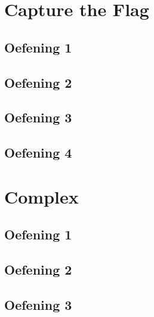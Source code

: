 \documentclass[a4paper,11pt]{report}
\begin{document}
\chapter{Capture the Flag}
\section{Oefening 1}

\section{Oefening 2}

\section{Oefening 3}

\section{Oefening 4}

\newpage

\chapter{Complex}
\section{Oefening 1}

\section{Oefening 2}

\section{Oefening 3}

\newpage
\end{document}
